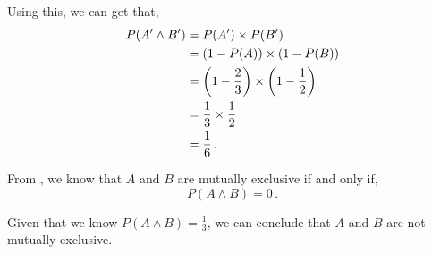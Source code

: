 \begin{subquestions}
\begin{subsubquestions}
Using this, we can get that,
\begin{align}
	P(A' \land B') & = P(A') \times P(B') \nonumber \\
	               & = (1-P(A)) \times (1-P(B)) \nonumber \\
	               & = \left(1 - \frac{2}{3}\right) \times \left(1 - \frac{1}{2}\right) \nonumber \\
	               & = \frac{1}{3} \times \frac{1}{2} \nonumber \\
	               & = \frac{1}{6} \,.
\end{align}

\end{subsubquestions}


\subquestion

From , we know that $A$ and $B$ are mutually exclusive if and only if,
\begin{equation}
	P(A \land B) = 0 \,.
\end{equation}

Given that we know $P(A \land B) = \frac{1}{3}$, we can conclude that $A$ and $B$ are not mutually exclusive.

\end{subquestions}